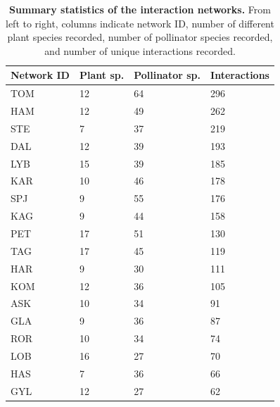 \begin{table}
\caption{\textbf{Summary statistics of the interaction networks.} From left to right, columns indicate network ID, number of different plant species recorded, number of pollinator species recorded, and number of unique interactions recorded.}
\label{tab:network_summary}
\begin{tabular}{llll}
\toprule
Network ID & Plant sp. & Pollinator sp. & Interactions \\
\midrule
TOM & 12 & 64 & 296 \\
HAM & 12 & 49 & 262 \\
STE & 7 & 37 & 219 \\
DAL & 12 & 39 & 193 \\
LYB & 15 & 39 & 185 \\
KAR & 10 & 46 & 178 \\
SPJ & 9 & 55 & 176 \\
KAG & 9 & 44 & 158 \\
PET & 17 & 51 & 130 \\
TAG & 17 & 45 & 119 \\
HAR & 9 & 30 & 111 \\
KOM & 12 & 36 & 105 \\
ASK & 10 & 34 & 91 \\
GLA & 9 & 36 & 87 \\
ROR & 10 & 34 & 74 \\
LOB & 16 & 27 & 70 \\
HAS & 7 & 36 & 66 \\
GYL & 12 & 27 & 62 \\
\bottomrule
\end{tabular}
\end{table}
